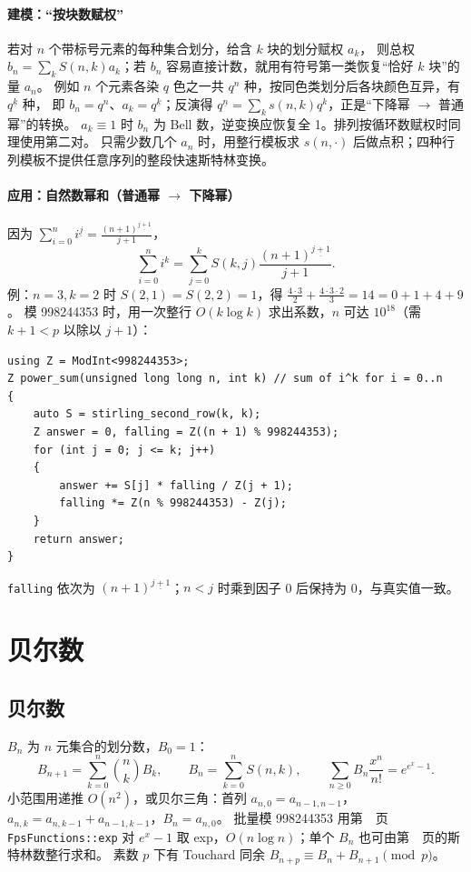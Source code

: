 \paragraph{建模：“按块数赋权”} 若对 $n$ 个带标号元素的每种集合划分，给含 $k$ 块的划分赋权 $a_k$，
则总权 $b_n=\sum_kS(n,k)a_k$；若 $b_n$ 容易直接计数，就用有符号第一类恢复“恰好 $k$ 块”的量 $a_n$。
例如 $n$ 个元素各染 $q$ 色之一共 $q^n$ 种，按同色类划分后各块颜色互异，有 $q^{\underline k}$ 种，
即 $b_n=q^n$、$a_k=q^{\underline k}$；反演得 $q^{\underline n}=\sum_ks(n,k)q^k$，正是“下降幂 $\to$ 普通幂”的转换。
$a_k\equiv1$ 时 $b_n$ 为 Bell 数，逆变换应恢复全 1。排列按循环数赋权时同理使用第二对。
只需少数几个 $a_n$ 时，用整行模板求 $s(n,\cdot)$ 后做点积；四种行列模板不提供任意序列的整段快速斯特林变换。

\paragraph{应用：自然数幂和（普通幂 $\to$ 下降幂）} 因为 $\sum_{i=0}^{n}i^{\underline j}=\frac{(n+1)^{\underline{j+1}}}{j+1}$，
\[
 \sum_{i=0}^{n}i^k=\sum_{j=0}^{k}S(k,j)\frac{(n+1)^{\underline{j+1}}}{j+1}.
\]
例：$n=3,k=2$ 时 $S(2,1)=S(2,2)=1$，得 $\frac{4\cdot3}{2}+\frac{4\cdot3\cdot2}{3}=14=0+1+4+9$。
模 998244353 时，用一次整行 $O(k\log k)$ 求出系数，$n$ 可达 $10^{18}$（需 $k+1<p$ 以除以 $j+1$）：
\begin{lstlisting}
using Z = ModInt<998244353>;
Z power_sum(unsigned long long n, int k) // sum of i^k for i = 0..n
{
    auto S = stirling_second_row(k, k);
    Z answer = 0, falling = Z((n + 1) % 998244353);
    for (int j = 0; j <= k; j++)
    {
        answer += S[j] * falling / Z(j + 1);
        falling *= Z(n % 998244353) - Z(j);
    }
    return answer;
}
\end{lstlisting}
\texttt{falling} 依次为 $(n+1)^{\underline{j+1}}$；$n<j$ 时乘到因子 0 后保持为 0，与真实值一致。


\Needspace{180pt}

\section{贝尔数}

\subsection{贝尔数}\label{knowledge-bell}
$B_n$ 为 $n$ 元集合的划分数，$B_0=1$：
\[
B_{n+1}=\sum_{k=0}^{n}\binom nk B_k,\qquad B_n=\sum_{k=0}^{n}S(n,k),\qquad \sum_{n\ge0}B_n\frac{x^n}{n!}=e^{e^x-1}.
\]
小范围用递推 $O(n^2)$，或贝尔三角：首列 $a_{n,0}=a_{n-1,n-1}$，$a_{n,k}=a_{n,k-1}+a_{n-1,k-1}$，$B_n=a_{n,0}$。
批量模 998244353 用第~\pageref{compact-FpsFunctions}~页 \texttt{FpsFunctions::exp} 对 $e^x-1$ 取 exp，$O(n\log n)$；单个 $B_n$ 也可由第~\pageref{compact-stirling_second_row}~页的斯特林数整行求和。
素数 $p$ 下有 Touchard 同余 $B_{n+p}\equiv B_n+B_{n+1}\pmod p$。



